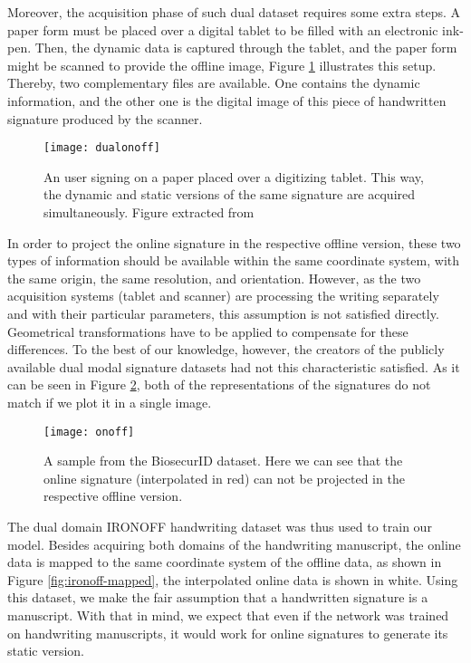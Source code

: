 Moreover, the acquisition phase of such dual dataset requires some extra steps. A paper form must be placed over a digital tablet to be filled with an electronic ink-pen. Then, the dynamic data is captured through the tablet, and the paper form might be scanned to provide the offline image, Figure \ref{fig:dualonoff} illustrates this setup. Thereby, two complementary files are available. One contains the dynamic information, and the other one is the digital image of this piece of handwritten signature produced by the scanner. 
\begin{figure}[!htb]
\centering
\texttt{[image: dualonoff]}

\caption{An user signing on a paper placed over a digitizing tablet. This way, the dynamic and static versions of the same signature are acquired simultaneously. Figure extracted from \cite{galbally2015line}}
\label{fig:dualonoff}
\end{figure}

In order to project the online signature in the respective offline version, these two types of information should be available within the same coordinate system, with the same origin, the same resolution, and orientation. However, as the two acquisition systems (tablet and scanner) are processing the writing separately and with their particular parameters, this assumption is not satisfied directly. Geometrical transformations have to be applied to compensate for these differences. To the best of our knowledge, however, the creators of the publicly available dual modal signature datasets \cite{biosecurid, biomet, myidea, sigcomp2009, sigma, sigwicomp2013, sigwicomp2015} had not this characteristic satisfied. As it can be seen in Figure \ref{fig:onoff}, both of the representations of the signatures do not match if we plot it in a single image.

\begin{figure}[!htb]
\centering
\texttt{[image: onoff]}
\caption{A sample from the BiosecurID dataset. Here we can see that the online signature (interpolated in red) can not be projected in the respective offline version.}
\label{fig:onoff}
\end{figure}

The dual domain IRONOFF \cite{viard1999ireste} handwriting dataset was thus used to train our model. Besides acquiring both domains of the handwriting manuscript, the online data is mapped to the same coordinate system of the offline data, as shown in Figure \ref{fig:ironoff-mapped}, the interpolated online data is shown in white. Using this dataset, we make the fair assumption that a handwritten signature is a manuscript. With that in mind, we expect that even if the network was trained on handwriting manuscripts, it would work for online signatures to generate its static version.

